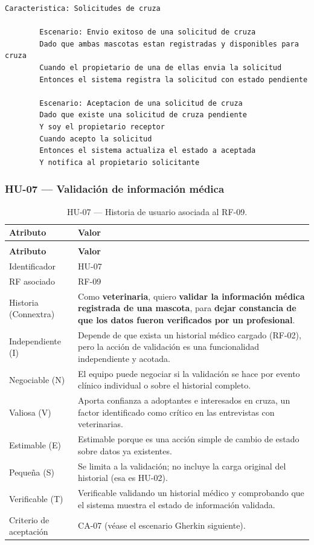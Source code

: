 \documentclass[journal,onecolumn]{IEEEtran}
\makeatletter
\newenvironment{atributos}[2]{%
	\small
	\begin{longtable}{@{}>{\raggedright\arraybackslash}p{4.2cm} >{\raggedright\arraybackslash}p{11.2cm}@{}}
		\caption{#2}\label{tab:#1}\\
		\toprule
		\textbf{Atributo} & \textbf{Valor} \\
		\midrule
		\endfirsthead
		\multicolumn{2}{@{}l}{\small\itshape (continuación)}\\
		\toprule
		\textbf{Atributo} & \textbf{Valor} \\
		\midrule
		\endhead
		\bottomrule
		\endlastfoot
	}{%
	\end{longtable}
	\normalsize
}
\makeatother
\begin{document}
	\begin{lstlisting}[style=gherkin,caption={CA-06 --- Escenario de aceptación de la historia HU-06.},label={lst:ca06}]
		Caracteristica: Solicitudes de cruza
		
		Escenario: Envio exitoso de una solicitud de cruza
		Dado que ambas mascotas estan registradas y disponibles para cruza
		Cuando el propietario de una de ellas envia la solicitud
		Entonces el sistema registra la solicitud con estado pendiente
		
		Escenario: Aceptacion de una solicitud de cruza
		Dado que existe una solicitud de cruza pendiente
		Y soy el propietario receptor
		Cuando acepto la solicitud
		Entonces el sistema actualiza el estado a aceptada
		Y notifica al propietario solicitante
	\end{lstlisting}
	
	\subsubsection{HU-07 --- Validación de información médica}
	
	\begin{atributos}{HU-07}{HU-07 --- Historia de usuario asociada al RF-09.}
		Identificador & HU-07 \\
		RF asociado & RF-09 \\
		Historia (Connextra) & Como \textbf{veterinaria}, quiero \textbf{validar la información médica registrada de una mascota}, para \textbf{dejar constancia de que los datos fueron verificados por un profesional}. \\
		Independiente (I) & Depende de que exista un historial médico cargado (RF-02), pero la acción de validación es una funcionalidad independiente y acotada. \\
		Negociable (N) & El equipo puede negociar si la validación se hace por evento clínico individual o sobre el historial completo. \\
		Valiosa (V) & Aporta confianza a adoptantes e interesados en cruza, un factor identificado como crítico en las entrevistas con veterinarias. \\
		Estimable (E) & Estimable porque es una acción simple de cambio de estado sobre datos ya existentes. \\
		Pequeña (S) & Se limita a la validación; no incluye la carga original del historial (esa es HU-02). \\
		Verificable (T) & Verificable validando un historial médico y comprobando que el sistema muestra el estado de información validada. \\
		Criterio de aceptación & CA-07 (véase el escenario Gherkin siguiente). \\
	\end{atributos}
	
\end{document}
